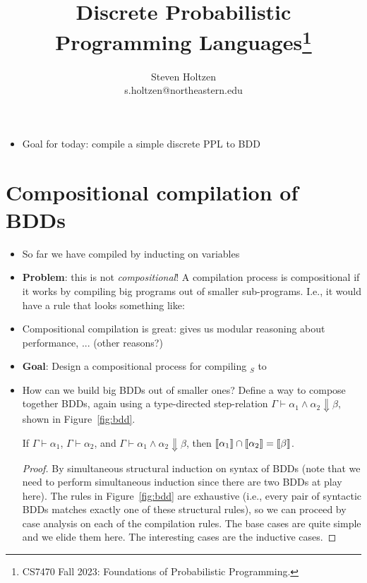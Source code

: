 \documentclass{tufte-handout}
\title{Discrete Probabilistic Programming Languages\thanks{CS7470 Fall 2023: Foundations of Probabilistic Programming.}}
\author[]{Steven Holtzen\\s.holtzen@northeastern.edu}
\begin{document}
\maketitle%

\begin{itemize}
  \item Goal for today: compile a simple discrete PPL to BDD
\end{itemize}

\section{Compositional compilation of BDDs}
\begin{itemize}
  \item So far we have compiled by inducting on variables
  \item \textbf{Problem}: this is not \emph{compositional}! A compilation
  process is compositional if it works by compiling big programs out of 
  smaller sub-programs. I.e., it would have a rule that looks something like:
  \begin{mathpar}
  \end{mathpar}
  \item Compositional compilation is great: gives us modular reasoning 
  about performance, ... (other reasons?)
  \item \textbf{Goal}: Design a compositional process for compiling \prop$_S$ to 
  \bdd{}

  \item How can we build big BDDs out of smaller ones? Define a way to compose together 
  BDDs, again using a type-directed step-relation $\Gamma \vdash \alpha_1 \land
  \alpha_2 \Downarrow \beta$, shown in Figure~\ref{fig:bdd}.

  
  \begin{theorem}[Correctness]
    If $\Gamma \vdash \alpha_1$, $\Gamma \vdash \alpha_2$, and $\Gamma \vdash \alpha_1 \land \alpha_2 \Downarrow \beta$, 
    then $\dbracket{\alpha_1} \cap \dbracket{\alpha_2} = \dbracket{\beta}$.
  \end{theorem}
  \begin{proof}
    By simultaneous structural induction on syntax of BDDs (note that we need to
    perform simultaneous induction since there are two BDDs at play here). The
    rules in Figure~\ref{fig:bdd} are exhaustive (i.e., every pair of syntactic BDDs matches
    exactly one of these structural rules), so we can proceed by case analysis on each
    of the compilation rules. The base cases are quite simple and we elide them here. The
    interesting cases are the inductive cases.


\end{proof}
\end{itemize}
\end{document}
